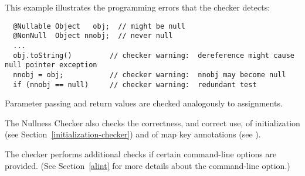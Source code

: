 This example illustrates the programming errors that the checker detects:

\begin{Verbatim}
  @Nullable Object   obj;  // might be null
  @NonNull  Object nnobj;  // never null
  ...
  obj.toString()         // checker warning:  dereference might cause null pointer exception
  nnobj = obj;           // checker warning:  nnobj may become null
  if (nnobj == null)     // checker warning:  redundant test
\end{Verbatim}

Parameter passing and return values are checked analogously to assignments.

The Nullness Checker also checks the correctness, and correct use, of
initialization (see
Section~\ref{initialization-checker}) and of map key annotations (see
).


The checker performs additional checks if certain 
command-line options are provided.  (See
Section~\ref{alint} for more details about the 
command-line option.)



